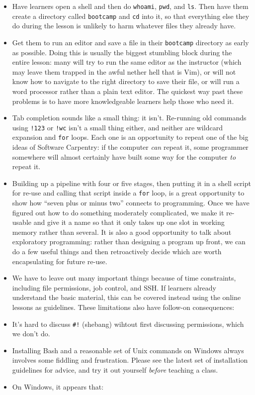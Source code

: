 \documentclass[]{book}
\begin{document}
\begin{itemize}
\item
  Have learners open a shell and then do \texttt{whoami}, \texttt{pwd},
  and \texttt{ls}. Then have them create a directory called
  \texttt{bootcamp} and \texttt{cd} into it, so that everything else
  they do during the lesson is unlikely to harm whatever files they
  already have.
\item
  Get them to run an editor and save a file in their \texttt{bootcamp}
  directory as early as possible. Doing this is usually the biggest
  stumbling block during the entire lesson: many will try to run the
  same editor as the instructor (which may leave them trapped in the
  awful nether hell that is Vim), or will not know how to navigate to
  the right directory to save their file, or will run a word processor
  rather than a plain text editor. The quickest way past these problems
  is to have more knowledgeable learners help those who need it.
\item
  Tab completion sounds like a small thing: it isn't. Re-running old
  commands using \texttt{!123} or \texttt{!wc} isn't a small thing
  either, and neither are wildcard expansion and \texttt{for} loops.
  Each one is an opportunity to repeat one of the big ideas of Software
  Carpentry: if the computer \emph{can} repeat it, some programmer
  somewhere will almost certainly have built some way for the computer
  \emph{to} repeat it.
\item
  Building up a pipeline with four or five stages, then putting it in a
  shell script for re-use and calling that script inside a \texttt{for}
  loop, is a great opportunity to show how ``seven plus or minus two''
  connects to programming. Once we have figured out how to do something
  moderately complicated, we make it re-usable and give it a name so
  that it only takes up one slot in working memory rather than several.
  It is also a good opportunity to talk about exploratory programming:
  rather than designing a program up front, we can do a few useful
  things and then retroactively decide which are worth encapsulating for
  future re-use.
\item
  We have to leave out many important things because of time
  constraints, including file permissions, job control, and SSH. If
  learners already understand the basic material, this can be covered
  instead using the online lessons as guidelines. These limitations also
  have follow-on consequences:
\item
  It's hard to discuss \texttt{\#!} (shebang) wihtout first discussing
  permissions, which we don't do.
\item
  Installing Bash and a reasonable set of Unix commands on Windows
  always involves some fiddling and frustration. Please see the latest
  set of installation guidelines for advice, and try it out yourself
  \emph{before} teaching a class.
\item
  On Windows, it appears that:


\end{itemize}
\end{document}
